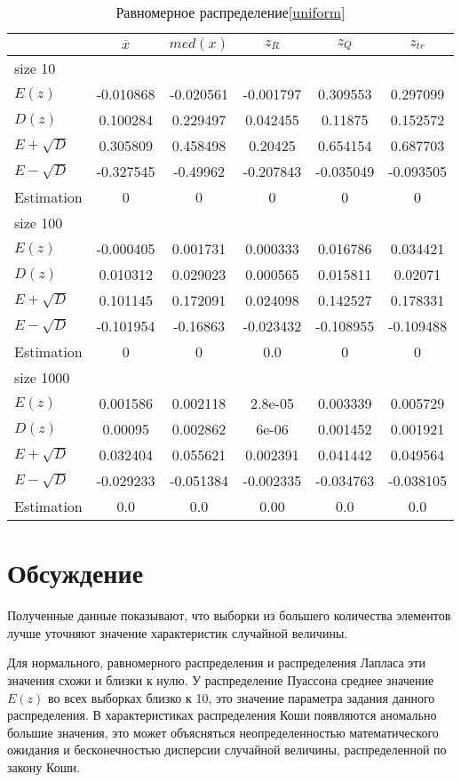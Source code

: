 \documentclass[12pt,a4paper]{article}
\begin{document}
\begin{table}[H]
    \centering
    \begin{tabular}{|l||c|c|c|c|c|}
        \hline
        & $\overline{x}$ & $med(x)$ & $z_R$ & $z_Q$ & $z_{tr}$\\\hline\hline
        size 10 & & & & &\\\hline
        $E(z)$ & -0.010868 & -0.020561 & -0.001797 & 0.309553 & 0.297099 \\\hline
        $D(z)$ & 0.100284 & 0.229497 & 0.042455 & 0.11875 & 0.152572 \\\hline
        $E + \sqrt D$ & 0.305809 & 0.458498 & 0.20425 & 0.654154 & 0.687703 \\\hline
        $E - \sqrt D$ & -0.327545 & -0.49962 & -0.207843 & -0.035049 & -0.093505 \\\hline
        Estimation & 0 & 0 & 0 & 0 & 0 \\\hline
        size 100 & & & & &\\\hline
        $E(z)$ & -0.000405 & 0.001731 & 0.000333 & 0.016786 & 0.034421 \\\hline
        $D(z)$ & 0.010312 & 0.029023 & 0.000565 & 0.015811 & 0.02071 \\\hline
        $E + \sqrt D$ & 0.101145 & 0.172091 & 0.024098 & 0.142527 & 0.178331 \\\hline
        $E - \sqrt D$ & -0.101954 & -0.16863 & -0.023432 & -0.108955 & -0.109488 \\\hline
        Estimation & 0 & 0 & 0.0 & 0 & 0 \\\hline
        size 1000 & & & & &\\\hline
        $E(z)$ & 0.001586 & 0.002118 & 2.8e-05 & 0.003339 & 0.005729 \\\hline
        $D(z)$ & 0.00095 & 0.002862 & 6e-06 & 0.001452 & 0.001921 \\\hline
        $E + \sqrt D$ & 0.032404 & 0.055621 & 0.002391 & 0.041442 & 0.049564 \\\hline
        $E - \sqrt D$ & -0.029233 & -0.051384 & -0.002335 & -0.034763 & -0.038105 \\\hline
        Estimation & 0.0 & 0.0 & 0.00 & 0.0 & 0.0 \\\hline
    \end{tabular}
    \caption{Равномерное распределение\eqref{uniform}}
    \label{tab:uniform}
\end{table}

\section{Обсуждение}
Полученные данные показывают, что выборки из большего количества элементов лучше уточняют значение характеристик случайной величины. 

Для нормального, равномерного распределения и распределения Лапласа эти значения схожи и близки к нулю. У распределение Пуассона среднее значение $E(z)$ во всех выборках близко к 10, это значение параметра задания данного распределения. В характеристиках распределения Коши появляются аномально большие значения, это может объясняться неопределенностью математического ожидания и бесконечностью дисперсии случайной величины, распределенной по закону Коши.
\end{document}
